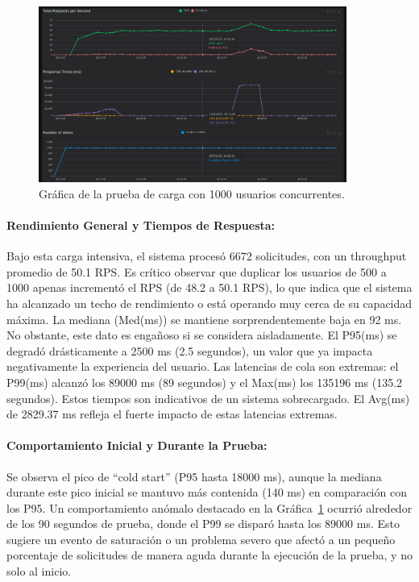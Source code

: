 \begin{figure}[H]
\centering
\includegraphics[width=0.9\textwidth]{figures/08_1000_1.png}
\caption{Gráfica de la prueba de carga con 1000 usuarios concurrentes.}
\label{fig:locust1000}
\end{figure}

\paragraph{Rendimiento General y Tiempos de Respuesta:}
Bajo esta carga intensiva, el sistema procesó 6672 solicitudes, con un throughput promedio de 50.1 RPS. Es crítico observar que duplicar los usuarios de 500 a 1000 apenas incrementó el RPS (de 48.2 a 50.1 RPS), lo que indica que el sistema ha alcanzado un techo de rendimiento o está operando muy cerca de su capacidad máxima.
La mediana (Med(ms)) se mantiene sorprendentemente baja en 92 ms. No obstante, este dato es engañoso si se considera aisladamente. El P95(ms) se degradó drásticamente a 2500 ms (2.5 segundos), un valor que ya impacta negativamente la experiencia del usuario. Las latencias de cola son extremas: el P99(ms) alcanzó los 89000 ms (89 segundos) y el Max(ms) los 135196 ms (135.2 segundos). Estos tiempos son indicativos de un sistema sobrecargado. El Avg(ms) de 2829.37 ms refleja el fuerte impacto de estas latencias extremas.

\paragraph{Comportamiento Inicial y Durante la Prueba:}
Se observa el pico de ``cold start'' (P95 hasta 18000 ms), aunque la mediana durante este pico inicial se mantuvo más contenida (140 ms) en comparación con los P95. Un comportamiento anómalo destacado en la Gráfica~\ref{fig:locust1000} ocurrió alrededor de los 90 segundos de prueba, donde el P99 se disparó hasta los 89000 ms. Esto sugiere un evento de saturación o un problema severo que afectó a un pequeño porcentaje de solicitudes de manera aguda durante la ejecución de la prueba, y no solo al inicio.

